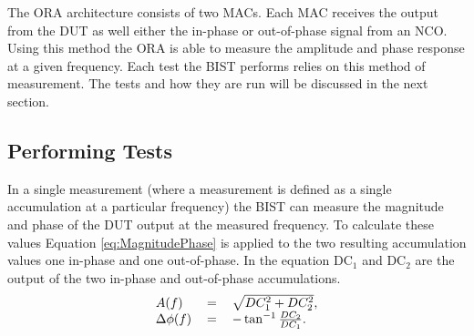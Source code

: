 \documentclass[12pt]{report}
\begin{document}
The ORA architecture consists of two MACs.  Each MAC receives the output from the DUT as well either the in-phase or out-of-phase signal from an NCO.  Using this method the ORA is able to measure the amplitude and phase response at a given frequency\cite{testtime}.  Each test the BIST performs relies on this method of measurement.  The tests and how they are run will be discussed in the next section.

\subsection{Performing Tests}
In a single measurement (where a measurement is defined as a single accumulation at a particular frequency) the BIST can measure the magnitude and phase of the DUT output at the measured frequency.  To calculate these values Equation \ref{eq:MagnitudePhase} is applied to the two resulting accumulation values one in-phase and one out-of-phase\cite{jie}.  In the equation DC$_1$ and DC$_2$ are the output of the two in-phase and out-of-phase accumulations.
\begin{equation}
  \begin{tabular}{lll}
	$A(f)$ & $=$ & $\sqrt{DC_1^2+DC_2^2}, \nonumber$ \\
	  $\Delta\phi(f)$ & $=$ & $-\tan^{-1}\frac{DC_2}{DC_1}.$
  \end{tabular}
  \label{eq:MagnitudePhase}
\end{equation}
\end{document}
